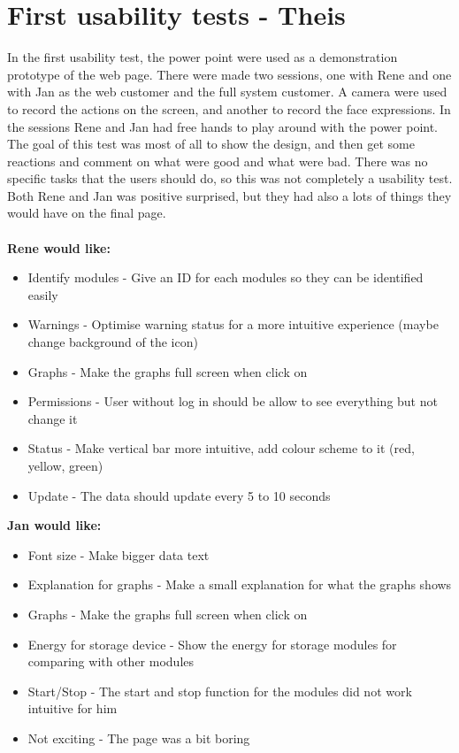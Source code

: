 \section{First usability tests - Theis}
In the first usability test, the power point were used as a demonstration prototype of the web page. There were made two sessions, one with Rene and one with Jan as the web customer and the full system customer. A camera were used to record the actions on the screen, and another to record the face expressions. In the sessions Rene and Jan had free hands to play around with the power point. The goal of this test was most of all to show the design, and then get some reactions and comment on what were good and what were bad. There was no specific tasks that the users should do, so this was not completely a usability test. Both Rene and Jan was positive surprised, but they had also a lots of things they would have on the final page.\\\\
\textbf{Rene would like:}
\begin{itemize}
	\item Identify modules - Give an ID for each modules so they can be identified easily
	\item Warnings - Optimise warning status for a more intuitive experience (maybe change background of the icon)
	\item Graphs - Make the graphs full screen when click on
	\item Permissions - User without log in should be allow to see everything but not change it
	\item Status - Make vertical bar more intuitive, add colour scheme to it (red, yellow, green)
	\item Update - The data should update every 5 to 10 seconds
\end{itemize}
\textbf{Jan would like:}
\begin{itemize}
	\item Font size - Make bigger data text
	\item Explanation for graphs - Make a small explanation for what the graphs shows
	\item Graphs - Make the graphs full screen when click on
	\item Energy for storage device - Show the energy for storage modules for comparing with other modules
	\item Start/Stop - The start and stop function for the modules did not work intuitive for him
	\item Not exciting - The page was a bit boring
\end{itemize}
